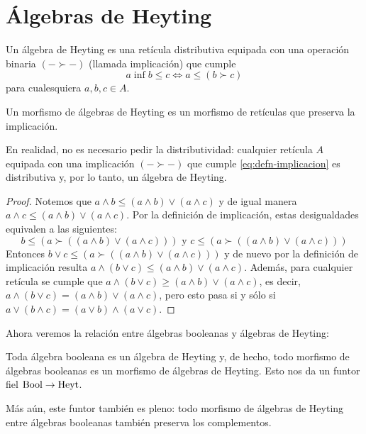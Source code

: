 \section{Álgebras de Heyting}
\label{ss:heyting}

\begin{defn}\label{defn:heyting}
  Un álgebra de Heyting es una retícula distributiva equipada con una
  operación binaria $(-\succ-)$ (llamada implicación) que cumple
  \begin{equation}\label{eq:defn-implicacion}
    a \inf b \leq c \iff a \leq (b\succ c)
  \end{equation}
  para cualesquiera $a,b,c\in A$.

  Un morfismo de álgebras de Heyting es un morfismo de retículas
  que preserva la implicación.
\end{defn}

En realidad, no es necesario pedir la distributividad: cualquier
retícula $A$ equipada con una implicación $(-\succ-)$ que cumple
\eqref{eq:defn-implicacion} es distributiva y, por lo tanto, un
álgebra de Heyting.

\begin{proof}
    Notemos que $a\wedge b \leq (a\wedge b)\vee (a\wedge c)$ y de
    igual manera $a\wedge c\leq  (a\wedge b)\vee (a\wedge c)$. Por la
    definición de implicación, estas desigualdades equivalen a las
    siguientes:
    $$b\leq (a \succ ((a \wedge b) \vee (a \wedge c))) \mbox{ y } c
    \leq (a\succ ((a \wedge b) \vee (a \wedge c)))$$
    Entonces $b \vee c \leq (a \succ ((a \wedge b) \vee (a \wedge
    c)))$ y de nuevo por la definición de implicación resulta $a
    \wedge (b \vee c)\leq (a\wedge b)\vee (a \wedge c)$. Además, para
    cualquier retícula se cumple que $a \wedge (b \vee c)\geq (a\wedge
    b)\vee (a \wedge c)$, es decir, $a \wedge (b \vee c)= (a\wedge
    b)\vee (a \wedge c)$, pero esto pasa si y sólo si $a \vee (b
    \wedge c)= (a\vee b)\wedge (a \vee c)$.
\end{proof}

Ahora veremos la relación entre álgebras booleanas y álgebras de
Heyting:
\begin{lemma}
  Toda álgebra booleana es un álgebra de Heyting y, de hecho,
  todo morfismo de álgebras booleanas es un morfismo de álgebras de
  Heyting. Esto nos da un funtor fiel $\mathrm{Bool}\to\mathrm{Heyt}$.

  Más aún, este funtor también es pleno: todo morfismo de álgebras de
  Heyting entre álgebras booleanas también preserva los complementos.
\end{lemma}

